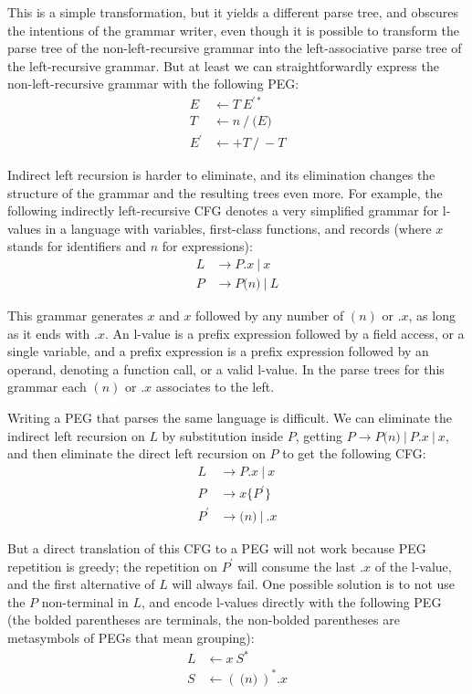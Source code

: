 This is a simple transformation, but it yields a different parse tree,
and obscures the intentions of the grammar writer, even though it is
possible to transform the parse tree of the non-left-recursive grammar
into the left-associative parse tree of the left-recursive
grammar. But at least we can straightforwardly express the non-left-recursive grammar with
the following PEG:
\begin{align*}
E & \leftarrow T\ E^{\prime *} \\
T & \leftarrow n \ / \ \boldsymbol{(}E \boldsymbol{)} \\
E^\prime & \leftarrow + T \ / \ - T
\end{align*}

Indirect left recursion is harder to eliminate, and its elimination
changes the structure of the grammar and the resulting trees even
more. For example, the following indirectly left-recursive CFG denotes a
very simplified grammar for l-values in a language with variables,
first-class functions, and records (where $x$ stands for identifiers and $n$
for expressions):
\begin{align*}
L & \rightarrow P.x \ | \ x \\
P & \rightarrow P\boldsymbol{(}n\boldsymbol{)} \ | \ L 
\end{align*}

This grammar generates $x$ and $x$ followed by any number of $(n)$ or
$.x$, as long as it ends with $.x$. An l-value is a prefix expression
followed by a field access, or a single variable, and a prefix
expression is a prefix expression followed by an operand, denoting a
function call, or a valid l-value. In the parse trees for this grammar each $(n)$ or $.x$ associates
to the left. 

Writing a PEG that parses the same language is difficult. We can eliminate the indirect left
recursion on $L$ by substitution inside $P$, getting $P \rightarrow
P\boldsymbol{(}n\boldsymbol{)} \ | \ P.x \ | \ x$, and then eliminate
the direct left recursion on $P$ to get the following CFG:
\begin{align*}
L & \rightarrow P.x \ | \ x \\
P & \rightarrow x \{P^\prime \} \\
P^\prime & \rightarrow \boldsymbol{(}n\boldsymbol{)} \ | \ .x
\end{align*}

But a direct translation of this CFG to a PEG will not work because PEG
repetition is greedy; the repetition on $P^\prime$ will consume the
last $.x$ of the l-value, and the first alternative of $L$ will always
fail. One possible solution is to not use the $P$ non-terminal in $L$,
and encode l-values directly with the following PEG (the bolded
parentheses are terminals, the non-bolded parentheses are metasymbols
of PEGs that mean grouping):
\begin{align*}
L & \leftarrow x \ S^*
\\
S & \leftarrow (\ \boldsymbol{(}n\boldsymbol{)}\ )^* .x
\end{align*}

